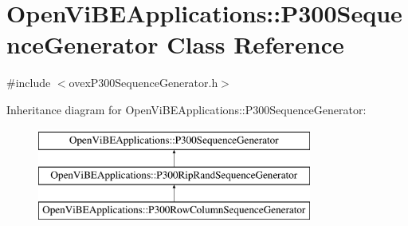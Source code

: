 \hypertarget{classOpenViBEApplications_1_1P300SequenceGenerator}{
\section{OpenViBEApplications::P300SequenceGenerator Class Reference}
\label{classOpenViBEApplications_1_1P300SequenceGenerator}
}


{\ttfamily \#include $<$ovexP300SequenceGenerator.h$>$}

Inheritance diagram for OpenViBEApplications::P300SequenceGenerator:\begin{figure}[H]
\begin{center}
\leavevmode
\includegraphics[height=3.000000cm]{classOpenViBEApplications_1_1P300SequenceGenerator}
\end{center}
\end{figure}
